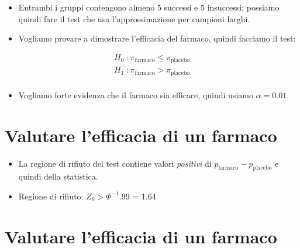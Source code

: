 \documentclass[
]{article}
\providecommand{\tightlist}{%
  \setlength{\itemsep}{0pt}\setlength{\parskip}{0pt}}
\begin{document}
\begin{itemize}
\tightlist
\item
  Entrambi i gruppi contengono almeno 5 successi e 5 insuccessi;
  possiamo quindi fare il test che usa l'approssimazione per campioni
  larghi.
\end{itemize}

\bigskip

\begin{itemize}
\tightlist
\item
  Vogliamo provare a dimostrare l'efficacia del farmaco, quindi facciamo
  il test:
\end{itemize}

\begin{align*}
H_0 \; : \pi_{\text{farmaco}} \leq \pi_{\text{placebo}}\\
H_1 \; : \pi_{\text{farmaco}} > \pi_{\text{placebo}}\\
\end{align*}

\begin{itemize}
\tightlist
\item
  Vogliamo forte evidenza che il farmaco sia efficace, quindi usiamo
  \(\alpha=0.01\).
\end{itemize}

\hypertarget{valutare-lefficacia-di-un-farmaco-1}{%
\section{Valutare l'efficacia di un
farmaco}\label{valutare-lefficacia-di-un-farmaco-1}}

\begin{itemize}
\tightlist
\item
  La regione di rifiuto del test contiene valori \emph{positivi} di
  \(p_{\text{farmaco}} - p_{\text{placebo}}\) e quindi della statistica.
\end{itemize}

\bigskip

\begin{itemize}
\tightlist
\item
  Regione di rifiuto: \(Z_0 > \Phi^{-1}{.99}\) = 1.64
\end{itemize}

\hypertarget{valutare-lefficacia-di-un-farmaco-2}{%
\section{Valutare l'efficacia di un
farmaco}\label{valutare-lefficacia-di-un-farmaco-2}}
\end{document}
